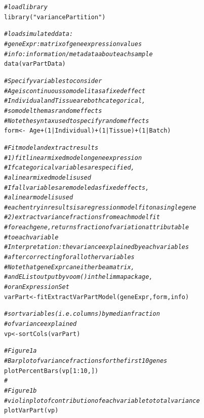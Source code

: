 \documentclass[12pt]{article}\usepackage[]{graphicx}\usepackage[]{xcolor}
\newcommand{\hlnum}[1]{\textcolor[rgb]{0.816,0.125,0.439}{#1}}%
\newcommand{\hlstr}[1]{\textcolor[rgb]{0.251,0.627,0.251}{#1}}%
\newcommand{\hlcom}[1]{\textcolor[rgb]{0.502,0.502,0.502}{\textit{#1}}}%
\newcommand{\hlopt}[1]{\textcolor[rgb]{0,0,0}{#1}}%
\newcommand{\hlstd}[1]{\textcolor[rgb]{0.251,0.251,0.251}{#1}}%
\newcommand{\hlkwb}[1]{\textcolor[rgb]{0,0,0}{#1}}%
\newcommand{\hlkwd}[1]{\textcolor[rgb]{0.878,0.439,0.125}{#1}}%
\newenvironment{knitrout}{}{} %
\begin{document}
\begin{knitrout}
\color{fgcolor}\begin{kframe}
\begin{alltt}
\hlcom{# load library}
\hlkwd{library}\hlstd{(}\hlstr{"variancePartition"}\hlstd{)}

\hlcom{# load simulated data:}
\hlcom{# geneExpr: matrix of gene expression values}
\hlcom{# info: information/metadata about each sample}
\hlkwd{data}\hlstd{(varPartData)}

\hlcom{# Specify variables to consider}
\hlcom{# Age is continuous so model it as a fixed effect}
\hlcom{# Individual and Tissue are both categorical,}
\hlcom{# so model them as random effects}
\hlcom{# Note the syntax used to specify random effects}
\hlstd{form} \hlkwb{<-} \hlopt{~} \hlstd{Age} \hlopt{+} \hlstd{(}\hlnum{1} \hlopt{|} \hlstd{Individual)} \hlopt{+} \hlstd{(}\hlnum{1} \hlopt{|} \hlstd{Tissue)} \hlopt{+} \hlstd{(}\hlnum{1} \hlopt{|} \hlstd{Batch)}

\hlcom{# Fit model and extract results}
\hlcom{# 1) fit linear mixed model on gene expression}
\hlcom{# If categorical variables are specified,}
\hlcom{#     a linear mixed model is used}
\hlcom{# If all variables are modeled as fixed effects,}
\hlcom{# 		a linear model is used}
\hlcom{# each entry in results is a regression model fit on a single gene}
\hlcom{# 2) extract variance fractions from each model fit}
\hlcom{# for each gene, returns fraction of variation attributable}
\hlcom{# 		to each variable}
\hlcom{# Interpretation: the variance explained by each variables}
\hlcom{# after correcting for all other variables}
\hlcom{# Note that geneExpr can either be a matrix,}
\hlcom{# and EList output by voom() in the limma package,}
\hlcom{# or an ExpressionSet}
\hlstd{varPart} \hlkwb{<-} \hlkwd{fitExtractVarPartModel}\hlstd{(geneExpr, form, info)}

\hlcom{# sort variables (i.e. columns) by median fraction}
\hlcom{# 		of variance explained}
\hlstd{vp} \hlkwb{<-} \hlkwd{sortCols}\hlstd{(varPart)}

\hlcom{# Figure 1a}
\hlcom{# Bar plot of variance fractions for the first 10 genes}
\hlkwd{plotPercentBars}\hlstd{(vp[}\hlnum{1}\hlopt{:}\hlnum{10}\hlstd{, ])}
\hlcom{#}
\hlcom{# Figure 1b}
\hlcom{# violin plot of contribution of each variable to total variance}
\hlkwd{plotVarPart}\hlstd{(vp)}
\end{alltt}
\end{kframe}
\end{knitrout}
\end{document}
